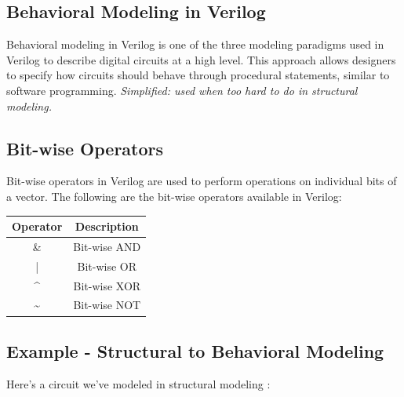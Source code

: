 \documentclass[12pt,openany, tikz,border=10pt]{book}
\begin{document}
\subsection{Behavioral Modeling in Verilog}

Behavioral modeling in Verilog is one of the three modeling paradigms used in Verilog to describe digital circuits at a high level. This approach allows designers to specify how circuits should behave through procedural statements, similar to software programming. 
\textit{Simplified: used when too hard to do in structural modeling.}  


\subsection{Bit-wise Operators}
Bit-wise operators in Verilog are used to perform operations on individual bits of a vector. The following are the bit-wise operators available in Verilog:
\begin{center}
	\begin{tabular}{|c|c|}
		\hline
		Operator & Description \\
		\hline
		\& & Bit-wise AND \\
		| & Bit-wise OR \\
		\^{} & Bit-wise XOR \\
		\~{} & Bit-wise NOT \\
		\hline
	\end{tabular}
\end{center}

\subsection{Example - Structural to Behavioral Modeling}
Here's a circuit we've modeled in structural modeling :
\end{document}
